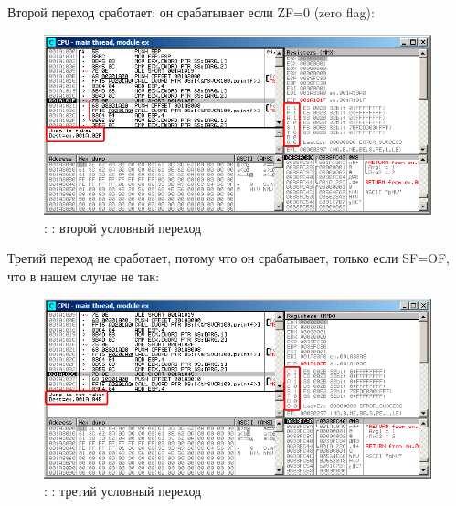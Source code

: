 \clearpage
Второй переход \JNZ сработает: он срабатывает если ZF=0 (zero flag):

\begin{figure}[H]
\centering
\includegraphics[scale=\FigScale]{patterns/07_jcc/simple/olly_signed2.png}
\caption{\olly: : второй условный переход}
\label{fig:jcc_olly_signed_2}
\end{figure}

\clearpage
Третий переход \JGE не сработает, потому что он срабатывает, только если SF=OF, что в нашем случае не так:

\begin{figure}[H]
\centering
\includegraphics[scale=\FigScale]{patterns/07_jcc/simple/olly_signed3.png}
\caption{\olly: : третий условный переход}
\label{fig:jcc_olly_signed_3}
\end{figure}
